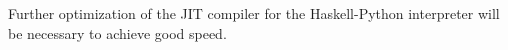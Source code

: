 Further optimization of the JIT compiler for the Haskell-Python interpreter will be
necessary to achieve good speed.

\begin{comment}
\subsection{Map GHC encoded Types to Haskell-Python}

Figure out how to create encoded types for Haskell-Python. It may be possible to
autogenerate these from GHC files.

"2.) understanding how GHC encodes types. The Core Haskell of the previous steps encodes the types of all functions in slightly low-level
ways. This needs to be understood and a mapping of these types to what
the Python Haskell interpreter provides needs to be written." 

\subsection{Set up GHC test environment for Haskell-Python}

Setting up the GHC test environment for Haskell-Python would be very valuable
for development and bug fixing.

"3.) the actual interpretation of the Core language is mostly
implemented. There are probably some things missing, which will be
discovered by running some Haskell programs. For that end, it would be
good to find out whether there is a Haskell implementation test suite
and get it to run."

\subsection{Add built in Haskell types to run some Haskell benchmarks}

"4.) what is missing to run more non-pure Haskell programs are all the
built-in functions (e.g. those that perform arithmetic, I/O, call C
functions, etc) and built-in types (e.g. integers, floats, C-level types
like arrays and structs). These should be added step by step. This is an
essentially open-ended task. It would be good to add as many built-ins
so that some of the Haskell benchmarks can run."

\subsection{Optimize PyPy JIT for Haskell-Python}

"5.) JIT work: While the JIT of PyPy can mostly be automatically applied,
in practice a lot of careful work is needed to make sure that the
generated code is optimal (or at least good). To do that, a test suite
of Haskell snippets that explicitly compares the generated machine code
with what it should look like is needed, and then the careful adding of
some tests to this suite, together with the better placement of JIT
hints. This is both the hardest step, as well as the most exciting one."
\end{comment}
